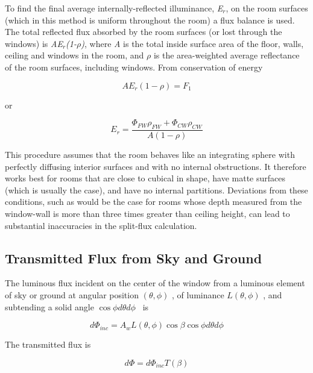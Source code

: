 To find the final average internally-reflected illuminance, \emph{E\(_{r}\)}, on the room surfaces (which in this method is uniform throughout the room) a flux balance is used. The total reflected flux absorbed by the room surfaces (or lost through the windows) is \emph{AE\(_{r}\)(1-$\rho$)}, where \emph{A} is the total inside surface area of the floor, walls, ceiling and windows in the room, and \emph{$\rho$} is the area-weighted average reflectance of the room surfaces, including windows. From conservation of energy

\begin{equation}
A{E_r}(1 - \rho ) = {F_1}
\end{equation}

or

\begin{equation}
{E_r} = \frac{{{\Phi_{FW}}{\rho_{FW}} + {\Phi_{CW}}{\rho_{CW}}}}{{A(1 - \rho )}}
\end{equation}

This procedure assumes that the room behaves like an integrating sphere with perfectly diffusing interior surfaces and with no internal obstructions. It therefore works best for rooms that are close to cubical in shape, have matte surfaces (which is usually the case), and have no internal partitions. Deviations from these conditions, such as would be the case for rooms whose depth measured from the window-wall is more than three times greater than ceiling height, can lead to substantial inaccuracies in the split-flux calculation.

\subsection{Transmitted Flux from Sky and Ground}\label{transmitted-flux-from-sky-and-ground}

The luminous flux incident on the center of the window from a luminous element of sky or ground at angular position \((\theta ,\phi )\) , of luminance \(L(\theta ,\phi )\) , and subtending a solid angle \(\cos \phi d\theta d\phi\) ~is

\begin{equation}
d{\Phi_{inc}} = {A_w}L(\theta ,\phi )\cos \beta \cos \phi d\theta d\phi
\end{equation}

The transmitted flux is

\begin{equation}
d\Phi  = d{\Phi_{inc}}T(\beta )
\end{equation}

